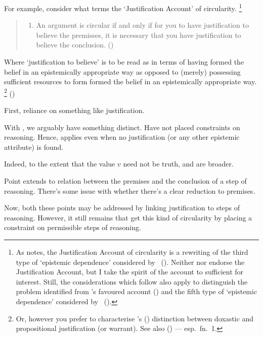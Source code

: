 \begin{note}
  For example, consider what \citeauthor{Sgaravatti:2013wu} terms the `Justification Account' of circularity.\nolinebreak
  \footnote{
    As \citeauthor{Sgaravatti:2013wu} notes, the Justification Account of circularity is a rewriting of the third type of `epistemic dependence' considered by \citeauthor{Pryor:2004ws}~(\citeyear[359]{Pryor:2004ws}).
    Neither \citeauthor{Pryor:2004ws} nor \citeauthor{Sgaravatti:2013wu} endorse the Justification Account, but I take the spirit of the account to sufficient for interest.
    Still, the considerations which follow also apply to distinguish the {\color{red} problem identified} from \citeauthor{Sgaravatti:2013wu}'s favoured account (\Citeyear[\S3]{Sgaravatti:2013wu}) and the fifth type of `epistemic dependence' considered by \citeauthor{Pryor:2004ws}~(\citeyear[359]{Pryor:2004ws}).
  }

  \begin{quote}
    \begin{enumerate}[label=(JA), ref=(JA)]
    \item\label{sg:JA} An argument is circular if and only if for you to have justification to believe the premisses, it is necessary that you have justification to believe the conclusion.\nolinebreak
      \mbox{}\hfill\mbox{(\Citeyear[754]{Sgaravatti:2013wu})}
    \end{enumerate}
  \end{quote}
  Where `justification to believe' is to be read as in terms of having formed the belief in an epistemically appropriate way as opposed to (merely) possessing sufficient resources to form formed the belief in an epistemically appropriate way.\nolinebreak
  \footnote{
    Or, however you prefer to characterise \citeauthor{Firth:1978vi}'s (\Citeyear{Firth:1978vi}) distinction between doxastic and propositional justification (or warrant).
    See also \citeauthor{Silva:2020aa} (\Citeyear{Silva:2020aa}) --- esp.\ fn.\ 1.
  }
  (\citeauthor[Cf.][754--755]{Sgaravatti:2013wu})
\end{note}

\begin{note}
  First, reliance on something like justification.

  With \support{}, we arguably have something distinct.
  Have not placed constraints on reasoning.
  Hence, \ideaCS{} applies even when no justification (or any other epistemic attribute) is found.

  Indeed, to the extent that the value \(v\) need not be truth, \ideaS{} and \ideaCS{} are broader.

  Point extends to relation between the premises and the conclusion of a step of reasoning.
  There's some issue with whether there's a clear reduction to premises.

  Now, both these points may be addressed by linking justification to steps of reasoning.
  However, it still remains that get this kind of circularity by placing a constraint on permissible steps of reasoning.
\end{note}

